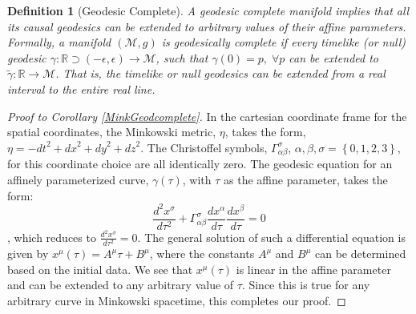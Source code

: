 \documentclass[11pt, a4paper]{report}
\theoremstyle{bfnote}
\newtheorem{definition}{Definition}
\begin{document}
\begin{samepage}
\begin{definition}[Geodesic Complete]
    A geodesic complete manifold implies that all its causal geodesics can be
    extended to arbitrary values of their affine parameters. Formally, a
    manifold $\left(\mathcal{M}, g\right)$ is geodesically complete if every
    timelike (or null) geodesic $\gamma : \mathbb{R}\supset \left(-\epsilon,
    \epsilon\right) \to \mathcal{M}$, such that $\gamma\left(0\right) = p,
    \;\forall p$ can be extended to $\widetilde{\gamma} : \mathbb{R} \to
    \mathcal{M}$. That is, the timelike or null geodesics can be extended from a
    real interval to the entire real line.
\end{definition}

\begin{proof}[Proof to Corollary \ref{MinkGeodcomplete}] 
    In the cartesian coordinate frame for the spatial coordinates, the Minkowski
    metric, $\eta$, takes the form, $\eta = -\textit{dt}^2 + \textit{dx}^2 +
    \textit{dy}^2 + \textit{dz}^2$. The Christoffel symbols,
    $\Gamma^{\sigma}_{\alpha\beta}$, $\alpha, \beta, \sigma = \left\{0, 1, 2,
    3\right\}$, for this coordinate choice are all identically zero. The geodesic
    equation for an affinely parameterized curve, $\gamma\left(\tau\right)$,
    with $\tau$ as the affine parameter, takes the form:
    \begin{equation*}
        \frac{d^2 x^\sigma}{d\tau^2} + \Gamma^{\sigma}_{\alpha\beta}\frac{dx^\alpha}{d\tau}\dfrac{dx^\beta}{d\tau} = 0
    \end{equation*}
    , which reduces to $\frac{d^2 x^\sigma}{d\tau^2} = 0$. The general solution of
    such a differential equation is given by $x^{\mu}\left(\tau\right) = A^\mu
    \tau + B^\mu$, where the constants $A^\mu$ and $B^\mu$ can be determined
    based on the initial data. We see that $x^\mu\left(\tau\right)$ is linear in
    the affine parameter and can be extended to any arbitrary value of $\tau$.
    Since this is true for any arbitrary curve in Minkowski spacetime, this
    completes our proof.
\end{proof}

\end{samepage}
\end{document}
